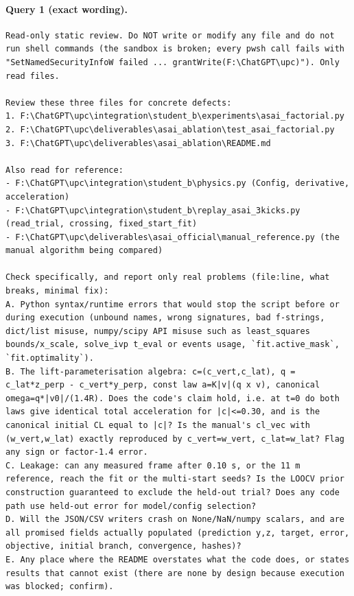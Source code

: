 \documentclass[UTF8,10pt]{ctexart}
\begin{document}
\paragraph{Query 1 (exact wording).}
\begin{Verbatim}[breaklines=true,breakanywhere=true,fontsize=\scriptsize,frame=single,framesep=2pt]
Read-only static review. Do NOT write or modify any file and do not run shell commands (the sandbox is broken; every pwsh call fails with "SetNamedSecurityInfoW failed ... grantWrite(F:\ChatGPT\upc)"). Only read files.

Review these three files for concrete defects:
1. F:\ChatGPT\upc\integration\student_b\experiments\asai_factorial.py
2. F:\ChatGPT\upc\deliverables\asai_ablation\test_asai_factorial.py
3. F:\ChatGPT\upc\deliverables\asai_ablation\README.md

Also read for reference:
- F:\ChatGPT\upc\integration\student_b\physics.py (Config, derivative, acceleration)
- F:\ChatGPT\upc\integration\student_b\replay_asai_3kicks.py (read_trial, crossing, fixed_start_fit)
- F:\ChatGPT\upc\deliverables\asai_official\manual_reference.py (the manual algorithm being compared)

Check specifically, and report only real problems (file:line, what breaks, minimal fix):
A. Python syntax/runtime errors that would stop the script before or during execution (unbound names, wrong signatures, bad f-strings, dict/list misuse, numpy/scipy API misuse such as least_squares bounds/x_scale, solve_ivp t_eval or events usage, `fit.active_mask`, `fit.optimality`).
B. The lift-parameterisation algebra: c=(c_vert,c_lat), q = c_lat*z_perp - c_vert*y_perp, const law a=K|v|(q x v), canonical omega=q*|v0|/(1.4R). Does the code's claim hold, i.e. at t=0 do both laws give identical total acceleration for |c|<=0.30, and is the canonical initial CL equal to |c|? Is the manual's cl_vec with (w_vert,w_lat) exactly reproduced by c_vert=w_vert, c_lat=w_lat? Flag any sign or factor-1.4 error.
C. Leakage: can any measured frame after 0.10 s, or the 11 m reference, reach the fit or the multi-start seeds? Is the LOOCV prior construction guaranteed to exclude the held-out trial? Does any code path use held-out error for model/config selection?
D. Will the JSON/CSV writers crash on None/NaN/numpy scalars, and are all promised fields actually populated (prediction y,z, target, error, objective, initial branch, convergence, hashes)?
E. Any place where the README overstates what the code does, or states results that cannot exist (there are none by design because execution was blocked; confirm).


\end{Verbatim}
\end{document}
